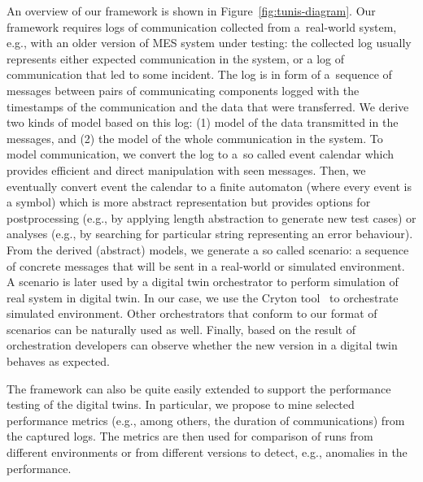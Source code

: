 {An overview of our framework is shown in Figure~\ref{fig:tunis-diagram}.  
%
Our framework requires logs of communication collected from a~real-world
system, e.g., with an older version of MES system under testing: the collected log
usually represents either expected communication in the system, or a log of
communication that led to some incident.  
%
The log is in form of a~sequence of messages between pairs of communicating
components logged with the timestamps of the communication and the data that
were transferred.
%
We derive two kinds of model based on this log: (1) model of the data
transmitted in the messages, and (2) the model of the whole communication in
the system.
%
To model communication, we convert the log to a~so called event calendar
which provides efficient and direct manipulation with seen messages.
Then, we eventually convert event the calendar to a finite automaton (where
every event is a symbol) which is more abstract representation but provides
options for postprocessing (e.g., by applying length abstraction to generate
new test cases) or analyses (e.g., by searching for particular string
representing an error behaviour).
%
From the derived (abstract) models, we generate a so called scenario: a
sequence of concrete messages that will be sent in a real-world or simulated
environment. 
%
A scenario is later used by a digital twin orchestrator to perform simulation
of real system in digital twin.
%
In our case, we use the Cryton tool~\cite{ref_cryton} to orchestrate simulated
environment. Other orchestrators that conform to our format of scenarios can be
naturally used as well. 
%
%
Finally, based on the result of orchestration developers can observe whether
the new version in a digital twin behaves as expected.


The framework can also be quite easily extended to support the performance
testing of the digital twins.
%
In particular, we propose to mine selected performance metrics (e.g., among
others, the duration of communications) from the captured logs.
%
The metrics are then used for comparison of runs from different environments or
from different versions to detect, e.g., anomalies in the performance.
%

}
